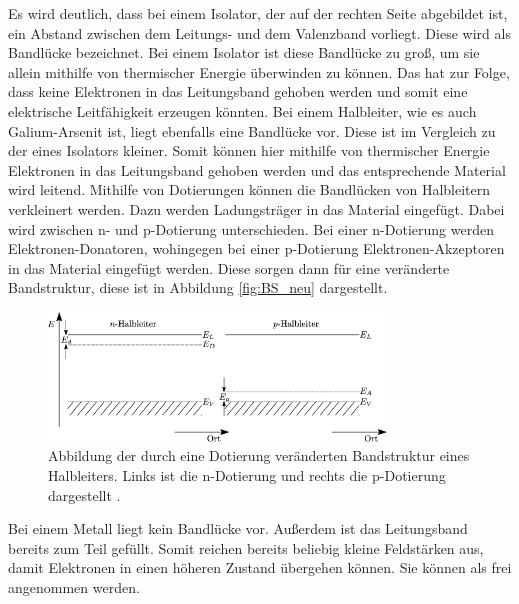 Es wird deutlich, dass bei einem Isolator, der auf der rechten Seite abgebildet ist, ein Abstand zwischen 
dem Leitungs- und dem Valenzband vorliegt. Diese wird als Bandlücke bezeichnet. Bei einem Isolator ist diese
Bandlücke zu groß, um sie allein mithilfe von thermischer Energie überwinden zu können. Das hat zur Folge, 
dass keine Elektronen in das Leitungsband gehoben werden und somit eine elektrische Leitfähigkeit erzeugen könnten. 
Bei einem Halbleiter, wie es auch Galium-Arsenit ist, liegt ebenfalls eine Bandlücke vor. Diese ist im Vergleich 
zu der eines Isolators kleiner. Somit können hier mithilfe von thermischer Energie Elektronen in das Leitungsband 
gehoben werden und das entsprechende Material wird leitend. Mithilfe von Dotierungen können die Bandlücken 
von Halbleitern verkleinert werden. Dazu werden Ladungsträger in das Material eingefügt. Dabei wird zwischen 
n- und p-Dotierung unterschieden. Bei einer n-Dotierung werden Elektronen-Donatoren, wohingegen bei einer p-Dotierung
Elektronen-Akzeptoren in das Material eingefügt werden. Diese sorgen dann für eine veränderte Bandstruktur, diese 
ist in Abbildung \ref{fig:BS_neu} dargestellt. \\
\begin{figure}[H]
    \centering
    \includegraphics[width=0.8\textwidth]{images/BS_neu.png}
    \caption{Abbildung der durch eine Dotierung veränderten Bandstruktur eines Halbleiters. Links ist die n-Dotierung und rechts 
    die p-Dotierung dargestellt \cite{BS_neu}.}
    \label{}
\end{figure} \noindent
Bei einem Metall liegt kein Bandlücke vor. Außerdem ist das Leitungsband bereits zum Teil gefüllt. Somit reichen
bereits beliebig kleine Feldstärken aus, damit Elektronen in einen höheren Zustand übergehen können. Sie können 
als frei angenommen werden. 
